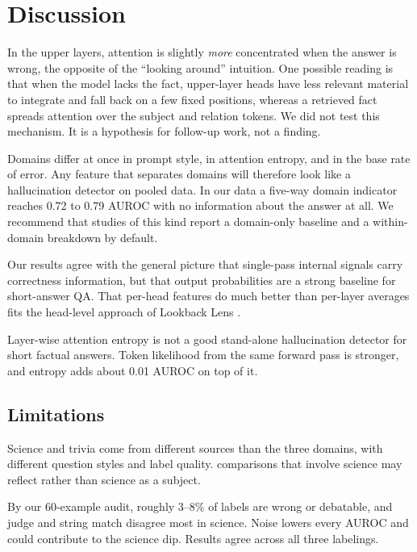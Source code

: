 \section{Discussion}
\label{sec:discussion}

In the upper layers, attention is slightly \emph{more} concentrated when the answer is wrong, the opposite of the ``looking around'' intuition.
One possible reading is that when the model lacks the fact, upper-layer heads have less relevant material to integrate and fall back on a few fixed positions, whereas a retrieved fact spreads attention over the subject and relation tokens.
We did not test this mechanism.
It is a hypothesis for follow-up work, not a finding.

Domains differ at once in prompt style, in attention entropy, and in the base rate of error.
Any feature that separates domains will therefore look like a hallucination detector on pooled data.
In our data a five-way domain indicator reaches 0.72 to 0.79 AUROC with no information about the answer at all.
We recommend that studies of this kind report a domain-only baseline and a within-domain breakdown by default.

Our results agree with the general picture that single-pass internal signals carry correctness information, but that output probabilities are a strong baseline for short-answer QA.
That per-head features do much better than per-layer averages fits the head-level approach of Lookback Lens \citep{chuang2024lookback}.

Layer-wise attention entropy is not a good stand-alone hallucination detector for short factual answers.
Token likelihood from the same forward pass is stronger, and entropy adds about 0.01 AUROC on top of it.

\subsection{Limitations}
\label{sec:limitations}

Science and trivia come from different sources than the three \popqa domains, with different question styles and label quality.
\Hthree comparisons that involve science may reflect \sciq rather than science as a subject.

By our 60-example audit, roughly 3--8\% of labels are wrong or debatable, and judge and string match disagree most in science.
Noise lowers every AUROC and could contribute to the science dip.
Results agree across all three labelings.

